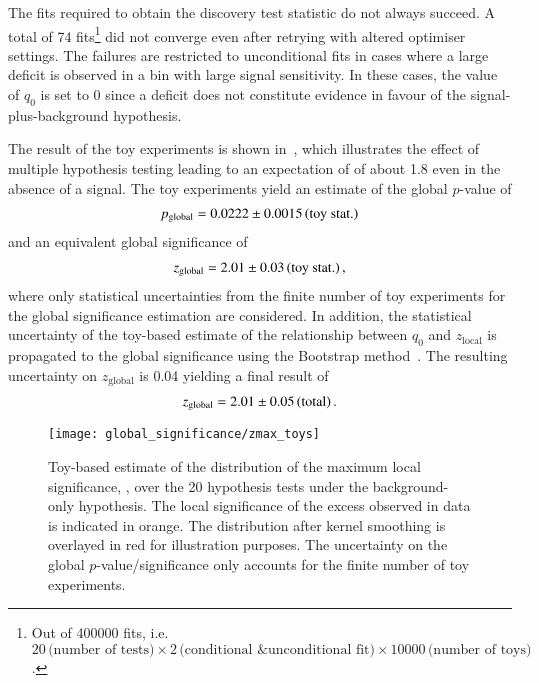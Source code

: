 The fits required to obtain the discovery test statistic do not always
succeed. A total of \num{74} fits\footnote{Out of \num{400000} fits, i.e.\
  $20\,\text{(number of tests)} \times 2\,\text{(conditional \& unconditional
    fit)} \times \num{10000}\,\text{(number of toys)}$.}  did not converge even
after retrying with altered optimiser settings. The failures are restricted to
unconditional fits in cases where a large deficit is observed in a bin with
large signal sensitivity. In these cases, the value of $q_0$ is set to 0 since a
deficit does not constitute evidence in favour of the signal-plus-background
hypothesis.

The result of the toy experiments is shown in~, which
illustrates the effect of multiple hypothesis testing leading to an expectation
of \Zmaxlocal of about \num{1.8} even in the absence of a signal. The toy
experiments yield an estimate of the global $p$-value of
\begin{align*}
  \pglobal = \num{0.0222}\numerrt{0.0015}{toy stat.}
\end{align*}
and an equivalent global significance of
\begin{align*}
  \zglobal = \num{2.01}\numerrt{0.03}{toy stat.} \,\text{,}
\end{align*}
where only statistical uncertainties from the finite number of toy experiments
for the global significance estimation are considered. In addition, the
statistical uncertainty of the toy-based estimate of the relationship between
$q_0$ and $z_{\text{local}}$ is propagated to the global significance using the
Bootstrap method~\cite{10.1214/aos/1176344552,efron1994introduction}. The
resulting uncertainty on $z_{\text{global}}$ is \num{0.04} yielding a final
result of
\begin{align*}
  \zglobal = \num{2.01}\numerrt{0.05}{total} \,\text{.}
\end{align*}

\begin{figure}[htbp]
  \centering

  \texttt{[image: global\_significance/zmax\_toys]}

  \caption[Toy-based estimate of the distribution of the maximum local
  significance under the background-only hypothesis.]{Toy-based estimate of the
    distribution of the maximum local significance, \Zmaxlocal, over the 20
    hypothesis tests under the background-only hypothesis. The local
    significance of the excess observed in data is indicated in orange. The
    distribution after kernel smoothing is overlayed in red for illustration
    purposes. The uncertainty on the global $p$-value/significance only accounts
    for the finite number of toy experiments.}%
  \label{fig:zmax_toys}
\end{figure}

